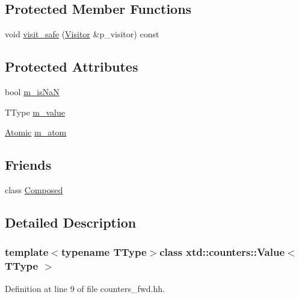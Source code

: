 \subsection*{Protected Member Functions}
\begin{DoxyCompactItemize}
\item 
void \hyperlink{classxtd_1_1counters_1_1Value_a7be35e9a5a52891c5946425152b4db30}{visit\-\_\-safe} (\hyperlink{classxtd_1_1counters_1_1Visitor}{Visitor} \&p\-\_\-visitor) const 
\end{DoxyCompactItemize}
\subsection*{Protected Attributes}
\begin{DoxyCompactItemize}
\item 
bool \hyperlink{classxtd_1_1counters_1_1Value_a28be66961121bb488351e2c2722fd18a}{m\-\_\-is\-Na\-N}
\item 
T\-Type \hyperlink{classxtd_1_1counters_1_1Value_abe06c1cebededaf2f216707171f63c3c}{m\-\_\-value}
\item 
\hyperlink{classxtd_1_1counters_1_1Atomic}{Atomic} \hyperlink{classxtd_1_1counters_1_1Value_a0cf45c8f82588321af127529ba4f214a}{m\-\_\-atom}
\end{DoxyCompactItemize}
\subsection*{Friends}
\begin{DoxyCompactItemize}
\item 
class \hyperlink{classxtd_1_1counters_1_1Value_a93e934ad70d5b32b14beed5572450abf}{Composed}
\end{DoxyCompactItemize}


\subsection{Detailed Description}
\subsubsection*{template$<$typename T\-Type$>$class xtd\-::counters\-::\-Value$<$ T\-Type $>$}



Definition at line 9 of file counters\-\_\-fwd.\-hh.



